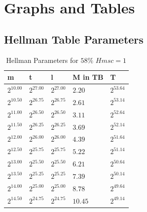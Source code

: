 \chapter{Graphs and Tables}
\section{Hellman Table Parameters}
\begin{table}[H]
  \centering
\begin{tabular}{lllll}
m & t & l & M in TB & T \\\hline
$2^{10.00}$ & $2^{27.00}$ & $2^{27.00}$ & $2.20$ & $2^{53.64}$ \\
$2^{10.50}$ & $2^{26.75}$ & $2^{26.75}$ & $2.61$ & $2^{53.14}$ \\
$2^{11.00}$ & $2^{26.50}$ & $2^{26.50}$ & $3.11$ & $2^{52.64}$ \\
$2^{11.50}$ & $2^{26.25}$ & $2^{26.25}$ & $3.69$ & $2^{52.14}$ \\
$2^{12.00}$ & $2^{26.00}$ & $2^{26.00}$ & $4.39$ & $2^{51.64}$ \\
$2^{12.50}$ & $2^{25.75}$ & $2^{25.75}$ & $5.22$ & $2^{51.14}$ \\
$2^{13.00}$ & $2^{25.50}$ & $2^{25.50}$ & $6.21$ & $2^{50.64}$ \\
$2^{13.50}$ & $2^{25.25}$ & $2^{25.25}$ & $7.39$ & $2^{50.14}$ \\
$2^{14.00}$ & $2^{25.00}$ & $2^{25.00}$ & $8.78$ & $2^{49.64}$ \\
$2^{14.50}$ & $2^{24.75}$ & $2^{24.75}$ & $10.45$ & $2^{49.14}$ \\
\end{tabular}
\caption{Hellman Parameters for $58\%$ $Hmsc = 1$}
\end{table}
